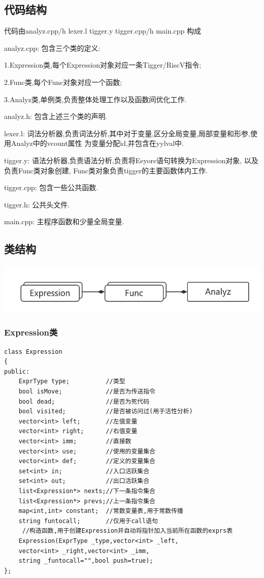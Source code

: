 \documentclass[UTF8]{article}
\begin{document}
\subsection{代码结构}
代码由analyz.cpp/h lexer.l tigger.y tigger.cpp/h main.cpp 构成

analyz.cpp: 包含三个类的定义: 

	1.Expression类,每个Expression对象对应一条Tigger/RiscV指令;
	
	2.Func类,每个Func对象对应一个函数; 
	
	3.Analyz类,单例类,负责整体处理工作以及函数间优化工作. 

analyz.h: 包含上述三个类的声明.

lexer.l: 词法分析器,负责词法分析,其中对于变量,区分全局变量,局部变量和形参,使用Analyz中的vcount属性
为变量分配id,并包含在yylval中.

tigger.y: 语法分析器,负责语法分析,负责将Eeyore语句转换为Expression对象, 以及负责Func类对象创建, Func类对象负责tigger的主要函数体内工作.

tigger.cpp: 包含一些公共函数.

tigger.h: 公共头文件.

main.cpp: 主程序函数和少量全局变量.
\subsection{类结构}
\includegraphics[width=0.7\linewidth]{uml} 

\subsubsection{Expression类}
\begin{lstlisting}
class Expression
{
public:
    ExprType type;          //类型
    bool isMove;            //是否为传送指令
    bool dead;              //是否为死代码
    bool visited;           //是否被访问过(用于活性分析)
    vector<int> left;       //左值变量
    vector<int> right;      //右值变量
    vector<int> imm;        //直接数
    vector<int> use;        //使用的变量集合
    vector<int> def;        //定义的变量集合
    set<int> in;            //入口活跃集合
    set<int> out;           //出口活跃集合
    list<Expression*> nexts;//下一条指令集合
    list<Expression*> prevs;//上一条指令集合
    map<int,int> constant;  //常数变量表,用于常数传播
    string funtocall;       //仅用于call语句
     //构造函数,用于创建Expression并自动将指针加入当前所在函数的exprs表
    Expression(ExprType _type,vector<int> _left,
    vector<int> _right,vector<int> _imm,
    string _funtocall="",bool push=true);
};
\end{lstlisting}
\end{document}

